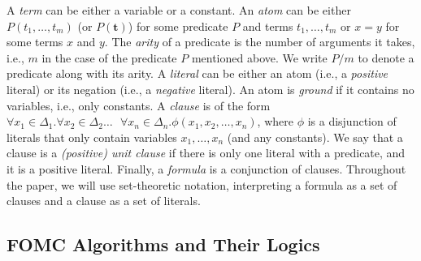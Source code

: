 \documentclass[a4paper,UKenglish,cleveref, autoref, thm-restate]{lipics-v2021}
\begin{document}
A \emph{term} can be either a variable or a constant. An \emph{atom} can be
either $P(t_{1}, \dots, t_{m})$ (or $P(\mathbf{t})$) for some predicate $P$ and
terms $t_{1}, \dots, t_{m}$ or $x=y$ for some terms $x$ and $y$. The
\emph{arity} of a predicate is the number of arguments it takes, i.e., $m$ in
the case of the predicate $P$ mentioned above. We write $P/m$ to denote a
predicate along with its arity. A \emph{literal} can be either an atom (i.e., a
\emph{positive} literal) or its negation (i.e., a \emph{negative} literal). An
atom is \emph{ground} if it contains no variables, i.e., only constants. A
\emph{clause} is of the form $\forall x_{1} \in \Delta_{1}\text{.
}\forall x_{2} \in \Delta_{2}\dots\text{ }\forall x_{n} \in \Delta_{n}\text{.
}\phi(x_{1}, x_{2}, \dots, x_{n})$, where $\phi$ is a disjunction of literals
that only contain variables $x_{1}, \dots, x_{n}$ (and any constants). We say
that a clause is a \emph{(positive) unit clause} if there is only one literal
with a predicate, and it is a positive literal. Finally, a \emph{formula} is a
conjunction of clauses. Throughout the paper, we will use set-theoretic
notation, interpreting a formula as a set of clauses and a clause as a set of
literals.


\subsection{FOMC Algorithms and Their Logics}\label{sec:threelogics}

\end{document}

